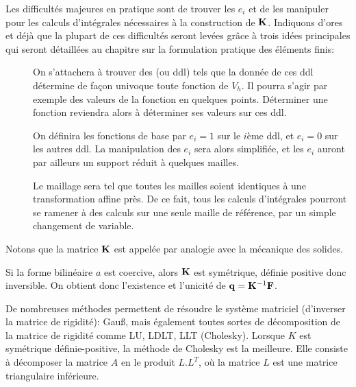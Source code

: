 \medskip
Les difficultés majeures en pratique sont de trouver les $e_i$ et de les manipuler
pour les calculs d'intégrales nécessaires à la construction de $\MM{K}$.
Indiquons d'ores et déjà que la plupart de ces difficultés seront levées
grâce à trois idées principales qui seront détaillées au chapitre sur
la formulation pratique des éléments finis:
\begin{description}
 \item[]

	On s'attachera à trouver des  (ou
	ddl) tels que la donnée de ces ddl détermine de façon univoque
	toute fonction de $V_h$.
	Il pourra s'agir par exemple des valeurs de la fonction en quelques points.
	Déterminer une fonction reviendra alors à déterminer ses valeurs sur ces ddl.
  \item[]

	On définira les fonctions de base par $e_i = 1$ sur le $i$ème ddl, et
	$e_i = 0$ sur les autres ddl.
	La manipulation des $e_i$ sera alors simplifiée, et les $e_i$
	auront par ailleurs un support réduit à quelques mailles.

	\item[]

	Le maillage sera tel que toutes les mailles soient identiques à une
	transformation affine près.
	De ce fait, tous les calculs d'intégrales pourront se ramener à
	des calculs sur une seule maille de référence, par un simple changement
	de variable.
\end{description}
\medskip
Notons que la matrice $\MM{K}$ est appelée  par
analogie avec la mécanique des solides.

\medskip
Si la forme bilinéaire $a$ est coercive, alors $\MM{K}$ est symétrique, définie positive
donc inversible. On obtient donc l'existence et l'unicité de $\VV{q} = \MMI{K}\VV{F}$.

De nombreuses méthodes permettent de résoudre le système matriciel (d'inverser la
matrice de rigidité): Gauß, mais également 
toutes sortes de décomposition de la matrice de rigidité comme LU, LDLT, LLT (Cholesky).
Lorsque $K$ est symétrique définie-positive, la méthode de Cholesky
est la meilleure. Elle consiste à décomposer la matrice $A$ en le produit $L.L^T$,
où la matrice $L$ est une matrice triangulaire inférieure.


